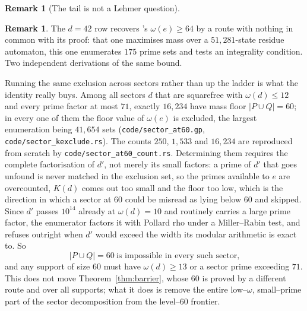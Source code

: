 \documentclass[11pt]{article}
\theoremstyle{definition}
\newtheorem{remark}[theorem]{Remark}
\begin{document}
\begin{remark}[The tail is not a Lehmer question]
\begin{remark}
The $d=42$ row recovers \cite{Bado2026b}'s $\omega(e)\ge64$ by a route with nothing in common with
its proof: that one maximises mass over a $51{,}281$-state residue automaton, this one enumerates
$175$ prime sets and tests an integrality condition. Two independent derivations of the same bound.

Running the same exclusion across sectors rather than up the ladder is what the identity really
buys. Among all sectors $d$ that are squarefree with $\omega(d)\le12$ and every prime factor at most
$71$, exactly $16{,}234$ have mass floor $|P\cup Q|=60$; in every one of them the floor value of
$\omega(e)$ is excluded, the largest enumeration being $41{,}654$ sets
\textup{(\texttt{code/sector\_at60.gp}, \texttt{code/sector\_kexclude.rs})}. The counts $250$, $1{,}533$
and $16{,}234$ are reproduced from scratch by \texttt{code/sector\_at60\_count.rs}. Determining them
requires the complete factorisation of $d'$, not merely its small factors: a prime of $d'$ that goes
unfound is never matched in the exclusion set, so the primes available to $e$ are overcounted, $K(d)$
comes out too small and the floor too low, which is the direction in which a sector at $60$ could be
misread as lying below $60$ and skipped. Since $d'$ passes $10^{14}$ already at $\omega(d)=10$ and
routinely carries a large prime factor, the enumerator factors it with Pollard rho under a
Miller--Rabin test, and refuses outright when $d'$ would exceed the width its modular arithmetic is
exact to. So
\[ |P\cup Q|=60\ \text{is impossible in every such sector,} \]
and any support of size $60$ must have $\omega(d)\ge13$ or a sector prime exceeding $71$. This does
not move Theorem~\ref{thm:barrier}, whose $60$ is proved by a different route and over all supports;
what it does is remove the entire low--$\omega$, small--prime part of the sector decomposition from
the level--$60$ frontier.


\end{remark}
\end{remark}
\end{document}

